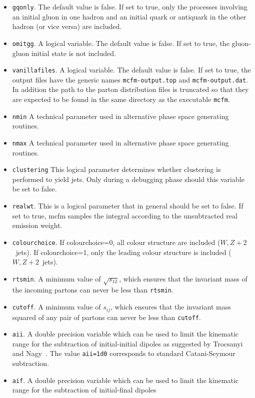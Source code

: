 \documentclass[12pt]{article}
\begin{document}
\begin{itemize}
\item {\tt gqonly}.  
The default value is false. If set to true, 
only the processes
involving an initial gluon in one hadron and an initial quark
or antiquark in the other hadron (or vice versa) are included.
\item {\tt omitgg}.  
A logical variable. 
The default value is false. If set to true, the gluon-gluon
initial state is not included.
\item {\tt vanillafiles}.  
A logical variable. The default value is false. If set to true, 
the output files have the generic names 
{\tt mcfm-output.top} and {\tt mcfm-output.dat}. In addition
the path to the parton distribution files is truncated so that
they are expected to be found in the same directory as the executable
{\tt mcfm}.
\item {\tt nmin}
A technical parameter used in alternative phase space generating routines.
\item {\tt nmax}
A technical parameter used in alternative phase space generating routines.
\item {\tt clustering}
This logical parameter determines whether clustering is performed to yield
jets. Only during a debugging phase should this variable be set to false. 
\item {\tt realwt}.  
This is a logical parameter that in general should be set to false.
If set to true, mcfm samples the integral according to the
unsubtracted real emission weight.
\item {\tt colourchoice}.  
If colourchoice=0, all colour structure are included ($W,Z+2$~jets).
If colourchoice=1, only the leading 
colour structure is included ($W,Z+2$~jets).
\item {\tt rtsmin}.  
A minimum value of $\sqrt{s_{12}}$, which ensures that the invariant mass
of the incoming partons can never be less than {\tt rtsmin}.
\item {\tt cutoff}.  
A minimum value of $s_{ij}$, which ensures that the invariant mass squared
of any pair of partons can never be less than {\tt cutoff}.
\item {\tt aii}.  
A double precision variable which can be used to
limit the kinematic range for the subtraction of initial-initial dipoles
as suggested by Trocsanyi and Nagy~\cite{Nagy:2003tz}.   
The value {\tt aii=1d0} corresponds 
to standard Catani-Seymour subtraction.
\item {\tt aif}.  
A double precision variable which can be used to
limit the kinematic range for the subtraction of initial-final dipoles

\end{itemize}
\end{document}
